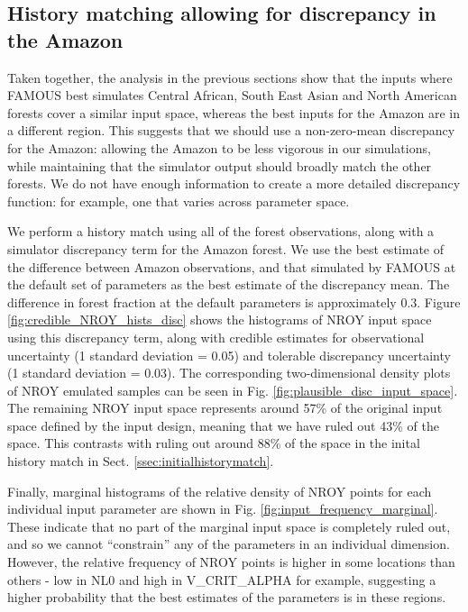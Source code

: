 \documentclass[esd, manuscript]{copernicus}
\begin{document}
\subsection{History matching allowing for discrepancy in the Amazon}\label{ssec:hist_disc}

Taken together, the analysis in the previous sections show that the inputs where FAMOUS best simulates Central African, South East Asian and North American forests cover a similar input space, whereas the best inputs for the Amazon are in a different region. This suggests that we should use a non-zero-mean discrepancy for the Amazon: allowing the Amazon to be less vigorous in our simulations, while maintaining that the simulator output should broadly match the other forests. We do not have enough information to create a more detailed discrepancy function: for example, one that varies across parameter space.

We perform a history match using all of the forest observations, along with a simulator discrepancy term for the Amazon forest. We use the best estimate of the difference between Amazon observations, and that simulated by FAMOUS at the default set of parameters as the best estimate of the discrepancy mean. The difference in forest fraction at the default parameters is approximately 0.3. Figure \ref{fig:credible_NROY_hists_disc} shows the histograms of NROY input space using this discrepancy term, along with credible estimates for observational uncertainty (1 standard deviation = 0.05) and tolerable discrepancy uncertainty (1 standard deviation = 0.03). The corresponding two-dimensional density plots of NROY emulated samples can be seen in Fig.  \ref{fig:plausible_disc_input_space}. The remaining NROY input space represents around 57\% of the original input space defined by the input design, meaning that we have ruled out 43\% of the space. This contrasts with ruling out around 88\% of the space in the inital history match in Sect. \ref{ssec:initialhistorymatch}.

Finally, marginal histograms of the relative density of NROY points for each individual input parameter are shown in Fig.  \ref{fig:input_frequency_marginal}. These indicate that no part of the marginal input space is completely ruled out, and so we cannot ``constrain'' any of the parameters in an individual dimension. However, the relative frequency of NROY points is higher in some locations than others - low in NL0 and high in V\_CRIT\_ALPHA for example, suggesting a higher probability that the best estimates of the parameters is in these regions.
\end{document}
